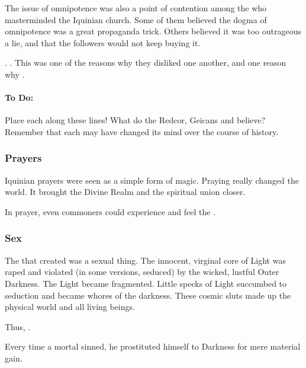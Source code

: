 The issue of omnipotence was also a point of contention among the \resphain who masterminded the Iquinian church.
Some of them believed the dogma of omnipotence was a great propaganda trick.
Others believed it was too outrageous a lie, and that the followers would not keep buying it. 

\ClanTelcra {}. 
\ClanRedcor {}. 
This was one of the reasons why they disliked one another, and one reason why .

\paragraph{To Do:}
  Place each \vclan along these lines!
  What do the Redcor, Geicans and \Telcras believe?
  Remember that each \vclan may have changed its mind over the course of history.





\subsubsection{Prayers}
Iquinian prayers were seen as a simple form of magic. 
Praying really changed the world. 
It brought the Divine Realm and the spiritual union closer. 

In prayer, even commoners could experience and feel the . 





\subsubsection{Sex}
The  that created  was a sexual thing. 
The innocent, virginal core of Light was raped and violated (in some versions, seduced) by the wicked, lustful Outer Darkness.
The Light became fragmented. 
Little specks of Light succumbed to seduction and became whores of the darkness.
These cosmic sluts made up the physical world and all living beings. 

Thus, . 

Every time a mortal sinned, he prostituted himself to Darkness for mere material gain. 

